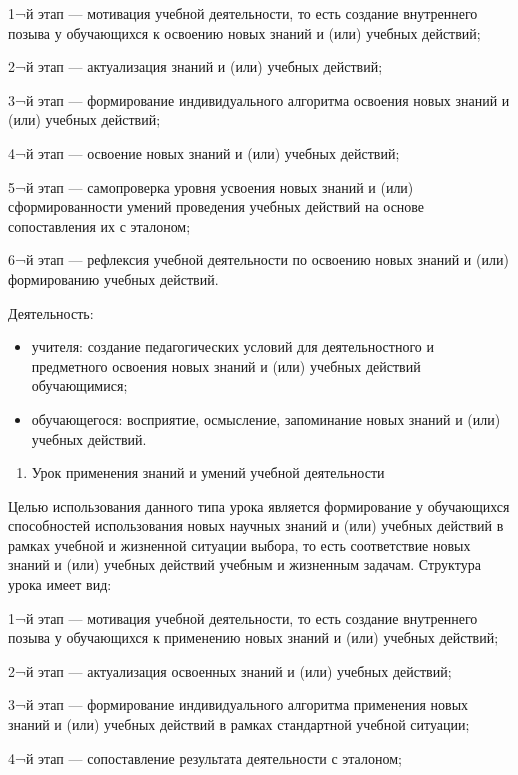 \documentclass[
  11pt,
  russian,
]{book}
\providecommand{\tightlist}{%
  \setlength{\itemsep}{0pt}\setlength{\parskip}{0pt}}
\begin{document}
1¬й этап --- мотивация учебной деятельности, то есть создание
внутреннего позыва у обучающихся к освоению новых знаний и (или) учебных
действий;

2¬й этап --- актуализация знаний и (или) учебных действий;

3¬й этап --- формирование индивидуального алгоритма освоения новых
знаний и (или) учебных действий;

4¬й этап --- освоение новых знаний и (или) учебных действий;

5¬й этап --- самопроверка уровня усвоения новых знаний и (или)
сформированности умений проведения учебных действий на основе
сопоставления их с эталоном;

6¬й этап --- рефлексия учебной деятельности по освоению новых знаний и
(или) формированию учебных действий.

Деятельность:

\begin{itemize}
\item
  учителя: создание педагогических условий для деятельностного и
  предметного освоения новых знаний и (или) учебных действий
  обучающимися;
\item
  обучающегося: восприятие, осмысление, запоминание новых знаний и (или)
  учебных действий.
\end{itemize}

\begin{enumerate}
\def\labelenumi{\arabic{enumi}.}
\setcounter{enumi}{1}
\tightlist
\item
  Урок применения знаний и умений учебной деятельности
\end{enumerate}

Целью использования данного типа урока является формирование у
обучающихся способностей использования новых научных знаний и (или)
учебных действий в рамках учебной и жизненной ситуации выбора, то есть
соответствие новых знаний и (или) учебных действий учебным и жизненным
задачам. Структура урока имеет вид:

1¬й этап --- мотивация учебной деятельности, то есть создание
внутреннего позыва у обучающихся к применению новых знаний и (или)
учебных действий;

2¬й этап --- актуализация освоенных знаний и (или) учебных действий;

3¬й этап --- формирование индивидуального алгоритма применения новых
знаний и (или) учебных действий в рамках стандартной учебной ситуации;

4¬й этап --- сопоставление результата деятельности с эталоном;
\end{document}
